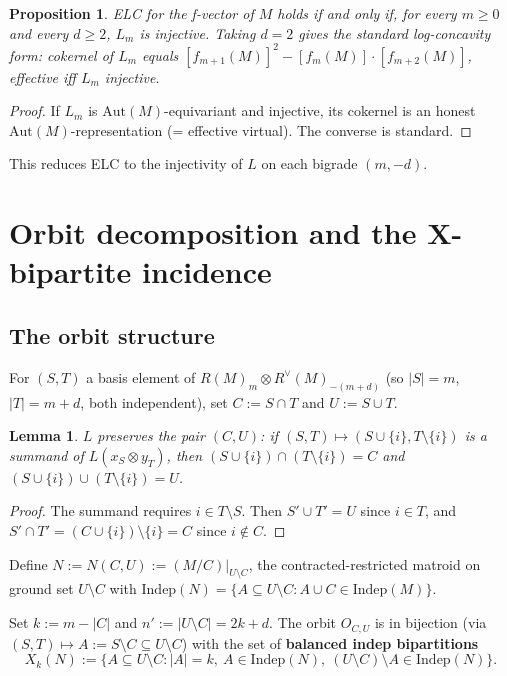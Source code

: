 \documentclass[11pt]{article}
\newtheorem{proposition}[theorem]{Proposition}
\newtheorem{lemma}[theorem]{Lemma}
\theoremstyle{definition}
\newcommand{\Indep}{\mathrm{Indep}}
\newcommand{\Aut}{\mathrm{Aut}}
\newcommand{\dualR}{R^{\vee}}
\begin{document}
\begin{proposition}
ELC for the f-vector of $M$ holds if and only if, for every $m \geq 0$ and every $d \geq 2$, $L_m$ is injective. Taking $d = 2$ gives the standard log-concavity form: cokernel of $L_m$ equals $[f_{m+1}(M)]^2 - [f_m(M)] \cdot [f_{m+2}(M)]$, effective iff $L_m$ injective.
\end{proposition}

\begin{proof}
If $L_m$ is $\Aut(M)$-equivariant and injective, its cokernel is an honest $\Aut(M)$-representation (= effective virtual). The converse is standard.
\end{proof}

This reduces ELC to the injectivity of $L$ on each bigrade $(m, -d)$.

\section{Orbit decomposition and the X-bipartite incidence}

\subsection{The orbit structure}

For $(S, T)$ a basis element of $R(M)_m \otimes \dualR(M)_{-(m+d)}$ (so $|S| = m$, $|T| = m+d$, both independent), set $C := S \cap T$ and $U := S \cup T$.

\begin{lemma}
$L$ preserves the pair $(C, U)$: if $(S, T) \mapsto (S \cup \{i\}, T \setminus \{i\})$ is a summand of $L(x_S \otimes y_T)$, then $(S \cup \{i\}) \cap (T \setminus \{i\}) = C$ and $(S \cup \{i\}) \cup (T \setminus \{i\}) = U$.
\end{lemma}

\begin{proof}
The summand requires $i \in T \setminus S$. Then $S' \cup T' = U$ since $i \in T$, and $S' \cap T' = (C \cup \{i\}) \setminus \{i\} = C$ since $i \notin C$.
\end{proof}

Define $N := N(C, U) := (M / C) \big|_{U \setminus C}$, the contracted-restricted matroid on ground set $U \setminus C$ with $\Indep(N) = \{A \subseteq U \setminus C : A \cup C \in \Indep(M)\}$.

Set $k := m - |C|$ and $n' := |U \setminus C| = 2k + d$. The orbit $O_{C, U}$ is in bijection (via $(S, T) \mapsto A := S \setminus C \subseteq U \setminus C$) with the set of \textbf{balanced indep bipartitions}
\[ X_k(N) := \big\{A \subseteq U \setminus C : |A| = k,\ A \in \Indep(N),\ (U \setminus C) \setminus A \in \Indep(N)\big\}. \]
\end{document}
